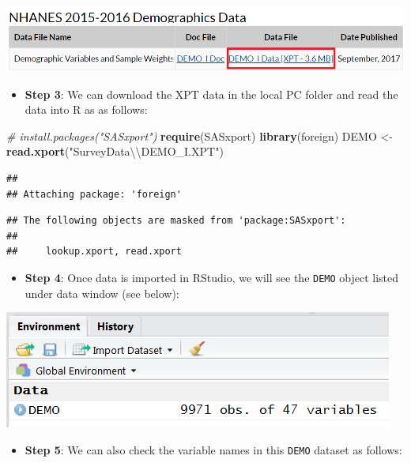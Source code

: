 \documentclass[
]{book}
\newenvironment{Shaded}{\begin{snugshade}}{\end{snugshade}}
\newcommand{\CharTok}[1]{\textcolor[rgb]{0.31,0.60,0.02}{#1}}
\newcommand{\CommentTok}[1]{\textcolor[rgb]{0.56,0.35,0.01}{\textit{#1}}}
\newcommand{\KeywordTok}[1]{\textcolor[rgb]{0.13,0.29,0.53}{\textbf{#1}}}
\newcommand{\NormalTok}[1]{#1}
\newcommand{\StringTok}[1]{\textcolor[rgb]{0.31,0.60,0.02}{#1}}
\providecommand{\tightlist}{%
  \setlength{\itemsep}{0pt}\setlength{\parskip}{0pt}}
\begin{document}
\includegraphics[width=0.65\linewidth]{images/xptsasdata}

\begin{itemize}
\tightlist
\item
  \textbf{Step 3}: We can download the XPT data in the local PC folder and read the data into R as as follows:
\end{itemize}

\begin{Shaded}
\begin{Highlighting}[]
\CommentTok{# install.packages("SASxport")}
\KeywordTok{require}\NormalTok{(SASxport)}
\KeywordTok{library}\NormalTok{(foreign)}
\NormalTok{DEMO <-}\StringTok{ }\KeywordTok{read.xport}\NormalTok{(}\StringTok{"SurveyData}\CharTok{\textbackslash{}\textbackslash{}}\StringTok{DEMO_I.XPT"}\NormalTok{)}
\end{Highlighting}
\end{Shaded}

\begin{verbatim}
## 
## Attaching package: 'foreign'
\end{verbatim}

\begin{verbatim}
## The following objects are masked from 'package:SASxport':
## 
##     lookup.xport, read.xport
\end{verbatim}

\begin{itemize}
\tightlist
\item
  \textbf{Step 4}: Once data is imported in RStudio, we will see the \texttt{DEMO} object listed under data window (see below):
\end{itemize}

\includegraphics[width=0.65\linewidth]{images/rdata}

\begin{itemize}
\tightlist
\item
  \textbf{Step 5}: We can also check the variable names in this \texttt{DEMO} dataset as follows:
\end{itemize}
\end{document}
